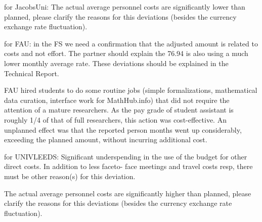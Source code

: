 

for JacobsUni:
The actual average personnel costs are significantly lower than planned, 
please clarify the reasons for this deviations (besides the currency exchange rate fluctuation).

for FAU:
in the FS we need a confirmation that the adjusted amount is related to costs and not effort.
The partner should explain the 76.94%
is also using a much lower monthly average rate. These deviations should be explained in the
Technical Report.

FAU hired students to do
some routine jobs (simple formalizations, mathematical data curation, interface work for
MathHub.info) that did not require the attention of a mature researchers. As the pay grade
of student assistant is roughly 1/4 of that of full researchers, this action was
cost-effective. An unplanned effect was that the reported person months went up
considerably, exceeding the planned amount, without incurring additional cost.


for UNIVLEEDS:
Significant underspending in the use of the budget for other direct costs. In addition to less faceto-
face meetings and travel costs resp, there must be other reason(s) for this deviation.

The actual average personnel costs are significantly higher than planned, 
please clarify the reasons for this deviations (besides the currency exchange rate fluctuation).


